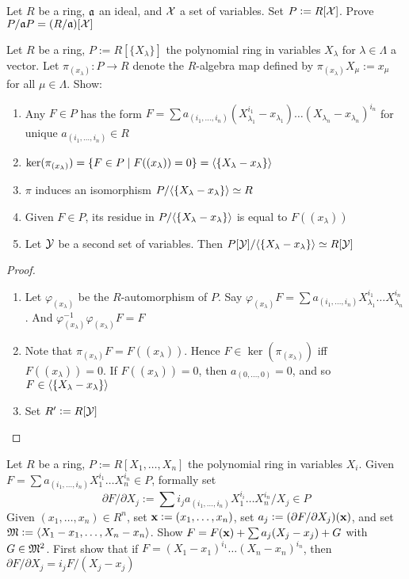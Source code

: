 \documentclass[11pt]{article}
\begin{document}
\begin{exercise}
\label{1.16}
Let \(R\) be a ring, \(\mathfrak{a}\) an ideal, and \(\mathcal{X}\) a set of variables. Set
\(P:=R[\mathcal{X}]\). Prove \(P/\mathfrak{a} P=(R/\mathfrak{a})[\mathcal{X}]\)
\end{exercise}

\begin{exercise}
\label{1.17}
Let \(R\) be a ring, \(P:=R[\{X_\lambda\}]\) the polynomial ring in variables
\(X_\lambda\) for \(\lambda\in\Lambda\) a vector. Let
\(\pi_{(x_\lambda)}:P\to R\) denote the \(R\)-algebra map defined by
\(\pi_{(x_\lambda)}X_\mu:=x_\mu\) for all \(\mu\in\Lambda\). Show:
\begin{enumerate}
\item Any \(F\in P\) has the form \(F=\sum
      a_{(i_1,\dots,i_n)}(X_{\lambda_1}^{i_1}-x_{\lambda_1})\dots
      (X_{\lambda_n}-x_{\lambda_n})^{i_n}\) for unique \(a_{(i_1,\dots,i_n)}\in R\)
\item \(\ker(\pi_{(x_\lambda)})=\{F\in P\mid F((x_\lambda))=0\}=\langle\{X_\lambda-x_\lambda\}\rangle\)
\item \(\pi\) induces an isomorphism \(P/\langle\{X_\lambda-x_\lambda\}\rangle\simeq R\)
\item Given \(F\in P\), its residue in \(P/\langle\{X_\lambda-x_\lambda\}\rangle\) is
equal to \(F((x_\lambda))\)
\item Let \(\mathcal{Y}\) be a second set of variables. Then
\(P[\mathcal{Y}]/\langle\{X_\lambda-x_\lambda\}\rangle\simeq R[\mathcal{Y}]\)
\end{enumerate}
\end{exercise}

\begin{proof}
\begin{enumerate}
\item Let \(\varphi_{(x_\lambda)}\) be the \(R\)-automorphism of \(P\). Say
\(\varphi_{(x_\lambda)}F=\sum a_{(i_1,\dots,i_n)}X_{\lambda_1}^{i_1}\dots
      X_{\lambda_n}^{i_n}\) . And \(\varphi_{(x_\lambda)}^{-1}\varphi_{(x_\lambda)}F=F\)
\item Note that \(\pi_{(x_\lambda)}F=F((x_\lambda))\). Hence
\(F\in\ker(\pi_{(x_\lambda)})\) iff \(F((x_\lambda))=0\). If
\(F((x_\lambda))=0\), then \(a_{(0,\dots,0)}=0\), and so \(F\in\langle\{X_\lambda-x_\lambda\}\rangle\)
\setcounter{enumi}{4}
\item Set \(R':=R[\mathcal{Y}]\)
\end{enumerate}
\end{proof}

\begin{exercise}
\label{ex.1.18}
Let \(R\) be a ring, \(P:=R[X_1,\dots,X_n]\) the polynomial ring in variables
\(X_i\). Given \(F=\sum a_{(i_1,\dots,i_n)}X_1^{i_1}\dots X_n^{i_n}\in P\),
formally set
\begin{equation*}
\partial F/\partial X_j:=\sum i_ja_{(i_1,\dots,i_n)}
X_1^{i_i}\dots X_n^{i_n}/X_j\in P
\end{equation*}
Given \((x_1,\dots,x_n)\in R^n\), set \(\operatorname{\textbf{x}}:=(x_1,\dots,x_n)\), set
\(a_j:=(\partial F/\partial X_j)(\operatorname{\textbf{x}})\), and set
\(\mathfrak{M}:=\langle X_1-x_1,\dots,X_n-x_n\rangle\). Show \(F=F(\operatorname{\textbf{x}})+\sum a_j(X_j-x_j)+G\)
with \(G\in\mathfrak{M}^2\). First show that if
\(F=(X_1-x_1)^{i_1}\dots(X_n-x_n)^{i_n}\), then \(\partial F/\partial X_j=i_jF/(X_j-x_j)\)
\end{exercise}
\end{document}
